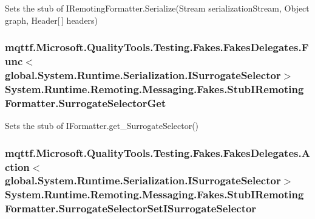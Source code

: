 Sets the stub of I\-Remoting\-Formatter.\-Serialize(\-Stream serialization\-Stream, Object graph, Header\mbox{[}$\,$\mbox{]} headers)

\hypertarget{class_system_1_1_runtime_1_1_remoting_1_1_messaging_1_1_fakes_1_1_stub_i_remoting_formatter_afbb4f2fb2d206f875f0811c0656958b3}{
\subsubsection[{Surrogate\-Selector\-Get}]{\setlength{\rightskip}{0pt plus 5cm}mqttf.\-Microsoft.\-Quality\-Tools.\-Testing.\-Fakes.\-Fakes\-Delegates.\-Func$<$global.\-System.\-Runtime.\-Serialization.\-I\-Surrogate\-Selector$>$ System.\-Runtime.\-Remoting.\-Messaging.\-Fakes.\-Stub\-I\-Remoting\-Formatter.\-Surrogate\-Selector\-Get}}\label{class_system_1_1_runtime_1_1_remoting_1_1_messaging_1_1_fakes_1_1_stub_i_remoting_formatter_afbb4f2fb2d206f875f0811c0656958b3}


Sets the stub of I\-Formatter.\-get\-\_\-\-Surrogate\-Selector()

\hypertarget{class_system_1_1_runtime_1_1_remoting_1_1_messaging_1_1_fakes_1_1_stub_i_remoting_formatter_a3bec58ff5b59fef29651625f59f785a3}{
\subsubsection[{Surrogate\-Selector\-Set\-I\-Surrogate\-Selector}]{\setlength{\rightskip}{0pt plus 5cm}mqttf.\-Microsoft.\-Quality\-Tools.\-Testing.\-Fakes.\-Fakes\-Delegates.\-Action$<$global.\-System.\-Runtime.\-Serialization.\-I\-Surrogate\-Selector$>$ System.\-Runtime.\-Remoting.\-Messaging.\-Fakes.\-Stub\-I\-Remoting\-Formatter.\-Surrogate\-Selector\-Set\-I\-Surrogate\-Selector}}\label{class_system_1_1_runtime_1_1_remoting_1_1_messaging_1_1_fakes_1_1_stub_i_remoting_formatter_a3bec58ff5b59fef29651625f59f785a3}


